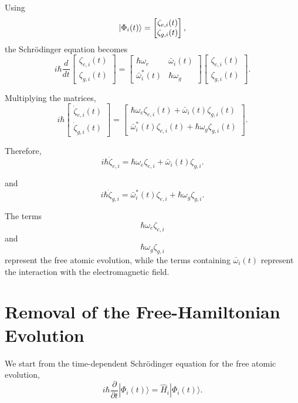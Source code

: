 \documentclass[12pt,a4paper]{article}
\begin{document}
Using
\[
\ket{\Phi_i(t)}
=
\begin{bmatrix}
\zeta_{e,i}(t)\\
\zeta_{g,i}(t)
\end{bmatrix},
\]
the Schr\"odinger equation becomes
\[
i\hbar
\frac{d}{dt}
\begin{bmatrix}
\zeta_{e,i}(t)\\
\zeta_{g,i}(t)
\end{bmatrix}
=
\begin{bmatrix}
\hbar\omega_e&\bar{\omega}_i(t)\\
\bar{\omega}_i^{*}(t)&\hbar\omega_g
\end{bmatrix}
\begin{bmatrix}
\zeta_{e,i}(t)\\
\zeta_{g,i}(t)
\end{bmatrix}.
\]

Multiplying the matrices,
\[
i\hbar
\begin{bmatrix}
\dot{\zeta}_{e,i}(t)\\
\dot{\zeta}_{g,i}(t)
\end{bmatrix}
=
\begin{bmatrix}
\hbar\omega_e\zeta_{e,i}(t)
+
\bar{\omega}_i(t)\zeta_{g,i}(t)
\\[4pt]
\bar{\omega}_i^{*}(t)\zeta_{e,i}(t)
+
\hbar\omega_g\zeta_{g,i}(t)
\end{bmatrix}.
\]

Therefore,
\begin{equation}
\boxed{
i\hbar\dot{\zeta}_{e,i}
=
\hbar\omega_e\zeta_{e,i}
+
\bar{\omega}_i(t)\zeta_{g,i}.
}
\tag{28a}
\end{equation}

and
\begin{equation}
\boxed{
i\hbar\dot{\zeta}_{g,i}
=
\bar{\omega}_i^{*}(t)\zeta_{e,i}
+
\hbar\omega_g\zeta_{g,i}.
}
\tag{28b}
\end{equation}

The terms
\[
\hbar\omega_e\zeta_{e,i}
\]
and
\[
\hbar\omega_g\zeta_{g,i}
\]
represent the free atomic evolution, while the terms containing
\(\bar{\omega}_i(t)\) represent the interaction with the
electromagnetic field.


\section{Removal of the Free-Hamiltonian Evolution}

We start from the time-dependent Schr\"odinger equation for the
free atomic evolution,
\[
i\hbar
\frac{\partial}{\partial t}
|\Phi_i(t)\rangle
=
\hat H_i|\Phi_i(t)\rangle.
\]
\end{document}
